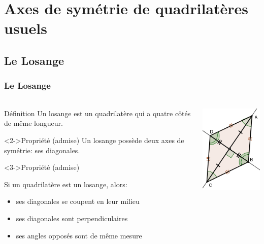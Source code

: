 \documentclass[xcolor={dvipsnames}]{beamer}
\begin{document}
\section{Axes de symétrie de quadrilatères usuels}

\subsection{Le Losange}

\begin{frame}
\frametitle{Le Losange}  
\framesubtitle{}

\begin{columns}[c]
	
	
	\begin{column}{9cm}
		
		\begin{block}{Définition}
			\small{Un losange est un quadrilatère qui a quatre côtés de même} longueur.
		\end{block}
		
		\begin{alertblock}<2->{Propriété (admise)}
			\small{Un losange possède deux axes de symétrie: ses diagonales.}
		\end{alertblock}
		
		\begin{alertblock}<3->{Propriété (admise)}
			\begin{small}
				
			 Si un quadrilatère est un losange, alors:
			 \begin{itemize}
			 	\item ses diagonales se coupent en leur milieu
			 	\item ses diagonales sont perpendiculaires
			 	\item ses angles opposés sont de même mesure
			 \end{itemize}
			 \end{small}
		\end{alertblock}
		

		
	\end{column}
	
	\begin{column}{2cm}
		\includegraphics[scale=0.5]{./img/losange}
	\end{column}
	
\end{columns}

\end{frame}
\end{document}
